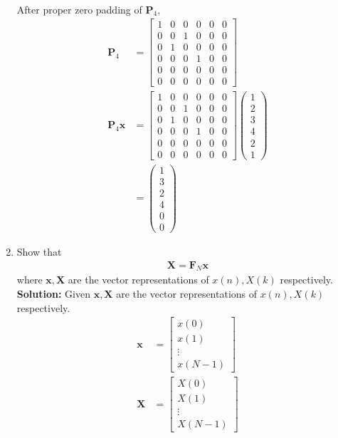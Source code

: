 \documentclass[journal,12pt,twocolumn]{IEEEtran}
\newcommand{\solution}{\noindent \textbf{Solution: }}
\let\vec\mathbf
\numberwithin{equation}{section}
\renewcommand\thesection{\arabic{section}}
\newcommand{\myvec}[1]{\ensuremath{\begin{pmatrix}#1\end{pmatrix}}}
\begin{document}
\begin{enumerate}[label=\arabic*.,ref=\thesection.\theenumi]
\begin{align}
\end{align}
After proper zero padding of $\vec{P}_4$,
\begin{align}
\vec{P}_4&=\begin{bmatrix}
1&0&0&0&0&0\\0&0&1&0&0&0\\0&1&0&0&0&0\\0&0&0&1&0&0\\0&0&0&0&0&0\\0&0&0&0&0&0
\end{bmatrix}\\
  \vec{P}_4 \vec{x}&=\begin{bmatrix}
1&0&0&0&0&0\\0&0&1&0&0&0\\0&1&0&0&0&0\\0&0&0&1&0&0\\0&0&0&0&0&0\\0&0&0&0&0&0
\end{bmatrix}\myvec{1\\2\\3\\4\\2\\1}\\
&=\myvec{1\\3\\2\\4\\0\\0}
\end{align}
\item Show that 
    \begin{align}
     \label{eq:dft-mat-def}
	    \vec{X} = \vec{F}_N \vec{x}
    \end{align}
		where $\vec{x}, \vec{X}$ are the vector representations of $x(n), X(k)$ respectively.\\
\solution Given $\vec{x}, \vec{X}$ are the vector representations of $x(n), X(k)$ respectively.
\begin{align}
\vec{x}&=\begin{bmatrix}
x(0)\\x(1)\\\vdots\\ x(N-1)
\end{bmatrix}\\
\vec{X}&=\begin{bmatrix}
X(0)\\X(1)\\ \vdots\\ X(N-1)
\end{bmatrix}\\

\end{align}
\end{enumerate}
\end{document}
